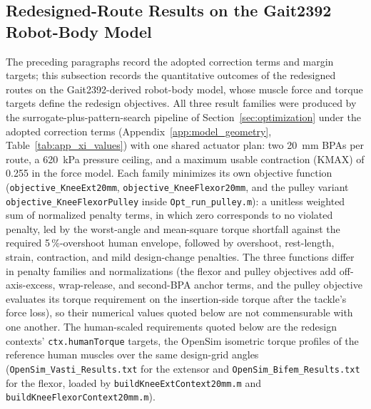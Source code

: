 \subsection{Redesigned-Route Results on the Gait2392 Robot-Body Model}\label{sec:route_redesign_results}

The preceding paragraphs record the adopted correction terms and margin targets; this subsection records the quantitative outcomes of the redesigned routes on the Gait2392-derived robot-body model, whose muscle force and torque targets define the redesign objectives. All three result families were produced by the surrogate-plus-pattern-search pipeline of Section~\ref{sec:optimization} under the adopted correction terms (Appendix~\ref{app:model_geometry}, Table~\ref{tab:app_xi_values}) with one shared actuator plan: two \qty{20}{\mm} BPAs per route, a \qty{620}{\kPa} pressure ceiling, and a maximum usable contraction (KMAX) of 0.255 in the force model. Each family minimizes its own objective function (\texttt{objective\_KneeExt20mm}, \texttt{objective\_KneeFlexor20mm}, and the pulley variant \texttt{objective\_KneeFlexorPulley} inside \texttt{Opt\_run\_pulley.m}): a unitless weighted sum of normalized penalty terms, in which zero corresponds to no violated penalty, led by the worst-angle and mean-square torque shortfall against the required 5\,\%-overshoot human envelope, followed by overshoot, rest-length, strain, contraction, and mild design-change penalties. The three functions differ in penalty families and normalizations (the flexor and pulley objectives add off-axis-excess, wrap-release, and second-BPA anchor terms, and the pulley objective evaluates its torque requirement on the insertion-side torque after the tackle's force loss), so their numerical values quoted below are not commensurable with one another. The human-scaled requirements quoted below are the redesign contexts' \texttt{ctx.humanTorque} targets, the OpenSim isometric torque profiles of the reference human muscles over the same design-grid angles (\texttt{OpenSim\_Vasti\_Results.txt} for the extensor and \texttt{OpenSim\_Bifem\_Results.txt} for the flexor, loaded by \texttt{buildKneeExtContext20mm.m} and \texttt{buildKneeFlexorContext20mm.m}).

